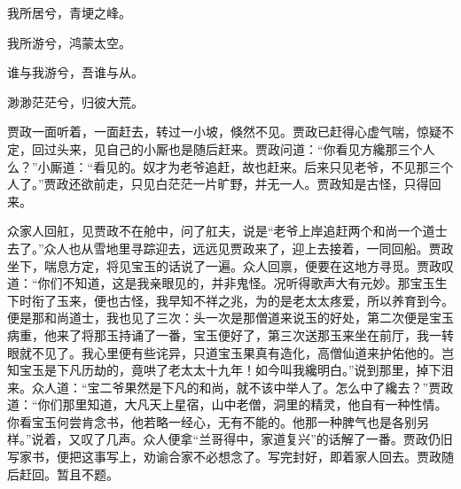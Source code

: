 \begin{poem}

    \begin{pl}
        我所居兮，青埂之峰。
    \end{pl}


    \begin{pl}
        我所游兮，鸿蒙太空。
    \end{pl}


    \begin{pl}
        谁与我游兮，吾谁与从。
    \end{pl}


    \begin{pl}
        渺渺茫茫兮，归彼大荒。
    \end{pl}
\end{poem}


\begin{parag}
    贾政一面听着，一面赶去，转过一小坡，倏然不见。贾政已赶得心虚气喘，惊疑不定，回过头来，见自己的小厮也是随后赶来。贾政问道：“你看见方纔那三个人么？”小厮道：“看见的。奴才为老爷追赶，故也赶来。后来只见老爷，不见那三个人了。”贾政还欲前走，只见白茫茫一片旷野，并无一人。贾政知是古怪，只得回来。
\end{parag}


\begin{parag}
    众家人回舡，见贾政不在舱中，问了舡夫，说是“老爷上岸追赶两个和尚一个道士去了。”众人也从雪地里寻踪迎去，远远见贾政来了，迎上去接着，一同回船。贾政坐下，喘息方定，将见宝玉的话说了一遍。众人回禀，便要在这地方寻觅。贾政叹道：“你们不知道，这是我亲眼见的，并非鬼怪。况听得歌声大有元妙。那宝玉生下时衔了玉来，便也古怪，我早知不祥之兆，为的是老太太疼爱，所以养育到今。便是那和尚道士，我也见了三次：头一次是那僧道来说玉的好处，第二次便是宝玉病重，他来了将那玉持诵了一番，宝玉便好了，第三次送那玉来坐在前厅，我一转眼就不见了。我心里便有些诧异，只道宝玉果真有造化，高僧仙道来护佑他的。岂知宝玉是下凡历劫的，竟哄了老太太十九年！如今叫我纔明白。”说到那里，掉下泪来。众人道：“宝二爷果然是下凡的和尚，就不该中举人了。怎么中了纔去？”贾政道：“你们那里知道，大凡天上星宿，山中老僧，洞里的精灵，他自有一种性情。你看宝玉何尝肯念书，他若略一经心，无有不能的。他那一种脾气也是各别另样。”说着，又叹了几声。众人便拿“兰哥得中，家道复兴”的话解了一番。贾政仍旧写家书，便把这事写上，劝谕合家不必想念了。写完封好，即着家人回去。贾政随后赶回。暂且不题。
\end{parag}


